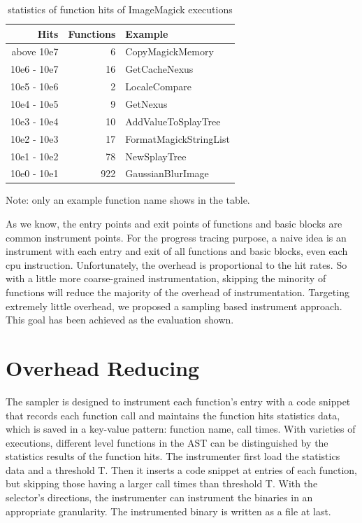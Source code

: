  \begin{table}[h]
\caption{statistics of function hits of ImageMagick executions}
\label{table:inst-stats}
\begin{center}
\begin{tabular}{r|r|l}
\hline
Hits & Functions & Example \\
\hline
above  10e7 & 6 & CopyMagickMemory \\
10e6 - 10e7 & 16 & GetCacheNexus \\
10e5 - 10e6 & 2 & LocaleCompare \\
10e4 - 10e5 & 9 & GetNexus \\
10e3 - 10e4 & 10 & AddValueToSplayTree \\
10e2 - 10e3 & 17 & FormatMagickStringList \\
10e1 - 10e2 & 78 & NewSplayTree \\
10e0 - 10e1 & 922 & GaussianBlurImage \\
\hline
\end{tabular}
\end{center}
Note: only an example function name shows in the table.
\end{table}

As we know, the entry points and exit points of functions and basic blocks are common instrument points. For the progress tracing purpose, a naive idea is an instrument with each entry and exit of all functions and basic blocks, even each cpu instruction. Unfortunately, the overhead is proportional to the hit rates. So with a little more coarse-grained instrumentation, skipping the minority of functions will reduce the majority of the overhead of instrumentation. Targeting extremely little overhead, we proposed a sampling based instrument approach. This goal has been achieved as the evaluation shown.

\section{Overhead Reducing}

The sampler is designed to instrument each function’s entry with a code snippet that records each function call and maintains the function hits statistics data, which is saved in a key-value pattern: function name, call times. With varieties of executions, different level functions in the AST can be distinguished by the statistics results of the function hits. The instrumenter first load the statistics data and a threshold T. Then it inserts a code snippet at entries of each function, but skipping those having a larger call times than threshold T. With the selector's directions, the instrumenter can instrument the binaries in an appropriate granularity. The instrumented binary is written as a file at last. 

